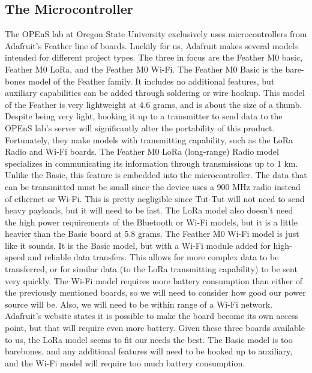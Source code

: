 \documentclass[letterpaper,10pt,draftclsnofoot,onecolumn]{article}
\begin{document}
\subsection{The Microcontroller}
The OPEnS lab at Oregon State University exclusively uses microcontrollers from Adafruit's Feather line of boards. Luckily for us, Adafruit makes several models intended for different project types. The three in focus are the Feather M0 basic, Feather M0 LoRa, and the Feather M0 Wi-Fi.
\newline
\newline
The Feather M0 Basic is the bare-bones model of the Feather family. It includes no additional features, but auxiliary capabilities can be added through soldering or wire hookup. This model of the Feather is very lightweight at 4.6 grams, and is about the size of a thumb. Despite being very light, hooking it up to a transmitter to send data to the OPEnS lab's server will significantly alter the portability of this product. Fortunately, they make models with transmitting capability, such as the LoRa Radio and Wi-Fi boards.
\cite{Basic}
\newline
\newline
The Feather M0 LoRa (long-range) Radio model specializes in communicating its information through transmissions up to 1 km. Unlike the Basic, this feature is embedded into the microcontroller. The data that can be transmitted must be small since the device uses a 900 MHz radio instead of ethernet or Wi-Fi. This is pretty negligible since Tut-Tut will not need to send heavy payloads, but it will need to be fast. The LoRa model also doesn't need the high power requirements of the Bluetooth or Wi-Fi models, but it is a little heavier than the Basic board at 5.8 grams.
\cite{LoRa}
\newline
\newline
The Feather M0 Wi-Fi model is just like it sounds. It is the Basic model, but with a Wi-Fi module added for high-speed and reliable data transfers. This allows for more complex data to be transferred, or for similar data (to the LoRa transmitting capability) to be sent very quickly. The Wi-Fi model requires more battery consumption than either of the previously mentioned boards, so we will need to consider how good our power source will be. Also, we will need to be within range of a Wi-Fi network. Adafruit's website states it is possible to make the board become its own access point, but that will require even more battery.
\cite{Wi-Fi}
\newline
\newline
Given these three boards available to us, the LoRa model seems to fit our needs the best. The Basic model is too barebones, and any additional features will need to be hooked up to auxiliary, and the Wi-Fi model will require too much battery consumption. 
\end{document}
